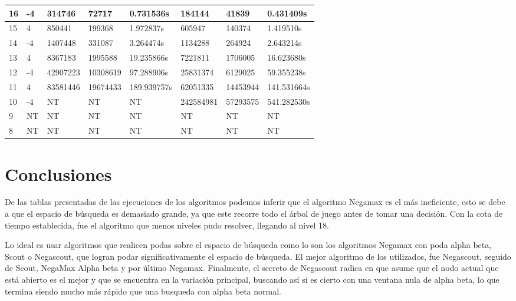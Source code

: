 \documentclass{article}
\begin{document}
\begin{table}[ht]
\begin{tabular}{|l|l|l|l|l|l|l|l|}
16    & -4             & 314746          & 72717         & 0.731536s& 184144          & 41839         & 0.431409s\\ \hline
15    & 4              & 850441          & 199368        & 1.972837s& 605947          & 140374        & 1.419510s\\ \hline
14    & -4             & 1407448         & 331087        & 3.264474s& 1134288         & 264924        & 2.643214s\\ \hline
13    & 4              & 8367183         & 1995588       & 19.235866s & 7221811         & 1706005       & 16.623680s \\ \hline
12    & -4             & 42907223        & 10308619      & 97.288906s & 25831374        & 6129025       & 59.355238s \\ \hline
11    & 4              & 83581446        & 19674433      & 189.939757s& 62051335        & 14453944      & 141.531664s\\ \hline
10    & -4             & NT              & NT            & NT             & 242584981       & 57293575      & 541.282530s\\ \hline
9    & NT             & NT              & NT            & NT             & NT              & NT            & NT             \\ \hline
8    & NT             & NT              & NT            & NT             & NT              & NT            & NT             \\ \hline
\end{tabular}
\end{table}

\clearpage

\section{Conclusiones}
\hspace{0.5cm}De las tablas presentadas de las ejecuciones de los algoritmos podemos inferir que el algoritmo Negamax es el más ineficiente, esto se debe a que el espacio de búsqueda es demasiado grande, ya que este recorre todo el árbol de juego antes de tomar una decisión. Con la cota de tiempo establecida, fue el algoritmo que menos niveles pudo resolver, llegando al nivel 18.

Lo ideal es usar algoritmos que realicen podas sobre el espacio de búsqueda como lo son los algoritmos Negamax con poda alpha beta, Scout o Negascout, que logran podar significativamente el espacio de
búsqueda.
El mejor algoritmo de los utilizados, fue Negascout, seguido de Scout, NegaMax Alpha beta y por último Negamax.
Finalmente, el secreto de Negascout radica en que asume que el nodo actual que está abierto es el
mejor y que se encuentra en la variación principal, buscando así si es cierto con una ventana nula de
alpha beta, lo que termina siendo mucho más rápido que una 
busqueda con alpha beta normal.
\end{document}
